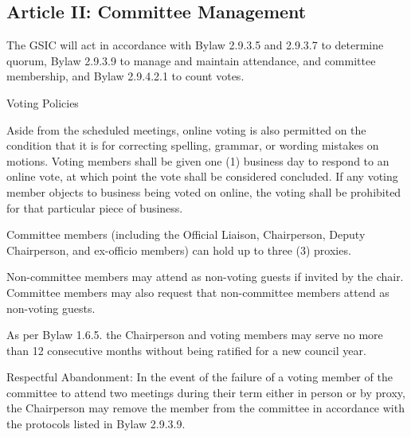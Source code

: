 \subsection{Article II: Committee Management}
\begin{longenum}[ label*=\thesubsection.\arabic*., align=left] 
\item The GSIC will act in accordance with Bylaw 2.9.3.5 and 2.9.3.7 to determine quorum, Bylaw 2.9.3.9 to manage and maintain attendance, and committee membership, and Bylaw 2.9.4.2.1 to count votes.
\item Voting Policies
	\begin{longenum}[ label*=\arabic*., align=left]
	\item Aside from the scheduled meetings, online voting is also permitted on the condition that it is for correcting spelling, grammar, or wording mistakes on motions. Voting members shall be given one (1) business day to respond to an online vote, at which point the vote shall be considered concluded. If any voting member objects to business being voted on online, the voting shall be prohibited for that particular piece of business.
	\item Committee members (including the Official Liaison, Chairperson, Deputy Chairperson, and ex-officio members) can hold up to three (3) proxies.
	\end{longenum}
\item Non-committee members may attend as non-voting guests if invited by the chair. Committee members may also request that non-committee members attend as non-voting guests.
\item As per Bylaw 1.6.5. the Chairperson and voting members may serve no more than 12 consecutive months without being ratified for a new council year.
\item Respectful Abandonment: In the event of the failure of a voting member of the committee to attend two meetings during their term either in person or by proxy, the Chairperson may remove the member from the committee in accordance with the protocols listed in Bylaw 2.9.3.9.
\end{longenum}

